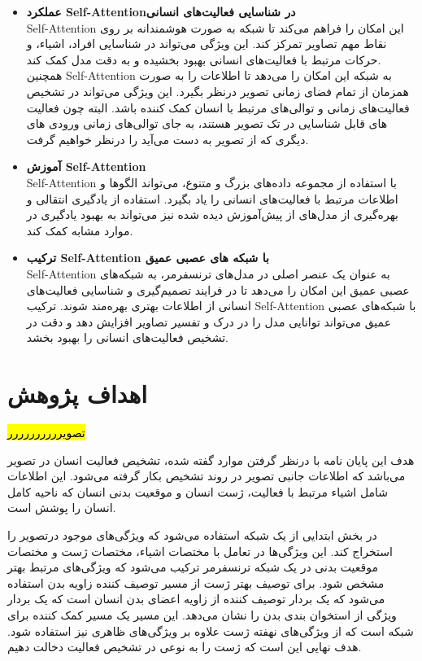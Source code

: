 \begin{itemize}
	\item \textbf{عملکرد \gls{Self-Attention}در شناسایی فعالیت‌های انسانی}\\
\gls{Self-Attention}
 این امکان را فراهم می‌کند تا شبکه به صورت هوشمندانه بر روی نقاط مهم تصاویر تمرکز کند. این ویژگی می‌تواند در شناسایی افراد، اشیاء، و حرکات مرتبط با فعالیت‌های انسانی بهبود بخشیده و به دقت مدل کمک کند.\\
 همچنین %
\gls{Self-Attention}
  به شبکه این امکان را می‌دهد تا اطلاعات را به صورت همزمان از تمام فضای زمانی تصویر درنظر بگیرد. این ویژگی می‌تواند در تشخیص فعالیت‌های زمانی و توالی‌های مرتبط با انسان کمک کننده باشد. البته چون فعالیت های قابل شناسایی در تک تصویر هستند، به جای توالی‌های زمانی ورودی های دیگری که از تصویر به دست می‌آید را درنظر خواهیم گرفت.
  	\item \textbf{آموزش \gls{Self-Attention}}\\
	\gls{Self-Attention}
  با استفاده از مجموعه داده‌های بزرگ و متنوع، می‌تواند الگوها و اطلاعات مرتبط با فعالیت‌های انسانی را یاد بگیرد. استفاده از یادگیری انتقالی و بهره‌گیری از مدل‌های از پیش‌آموزش دیده شده نیز می‌تواند به بهبود یادگیری در موارد مشابه کمک کند.
    	\item \textbf{ترکیب \gls{Self-Attention} با شبکه های عصبی عمیق}\\
	\gls{Self-Attention}
 به عنوان یک عنصر اصلی در مدل‌های ترنسفرمر، به شبکه‌های عصبی عمیق این امکان را می‌دهد تا در فرایند تصمیم‌گیری و شناسایی فعالیت‌های انسانی از اطلاعات بهتری بهره‌مند شوند.
 ترکیب %
   \gls{Self-Attention}
  با شبکه‌های عصبی عمیق می‌تواند توانایی مدل را در درک و تفسیر تصاویر افزایش دهد و دقت در تشخیص فعالیت‌های انسانی را بهبود بخشد.
\end{itemize}
\section{اهداف پژوهش}
\hl{تصویرررررررررر}

هدف این پایان نامه با درنظر گرفتن موارد گفته شده، تشخیص فعالیت انسان در تصویر می‌باشد که اطلاعات جانبی تصویر در روند تشخیص بکار گرفته می‌شود. این اطلاعات شامل اشیاء مرتبط با فعالیت، ژست انسان و موقعیت بدنی انسان که ناحیه کامل انسان را پوشش است.

در بخش ابتدایی از یک شبکه استفاده می‌شود که ویژگی‌های موجود درتصویر را استخراج کند. این ویژگی‌ها در تعامل با مختصات اشیاء، مختصات ژست و مختصات موقعیت بدنی در یک شبکه ترنسفرمر ترکیب می‌شود که ویژگی‌های مرتبط بهتر مشخص شود. برای توصیف بهتر ژست از مسیر توصیف کننده زاویه بدن استفاده می‌شود که یک بردار توصیف کننده از زاویه اعضای بدن انسان است که یک بردار ویژگی از استخوان بندی بدن را نشان می‌دهد. این مسیر یک مسیر کمک کننده برای شبکه است که از ویژگی‌های نهفته ژست علاوه بر ویژگی‌های ظاهری نیز استفاده شود. هدف نهایی این است که ژست را به نوعی در تشخیص فعالیت دخالت دهیم.

